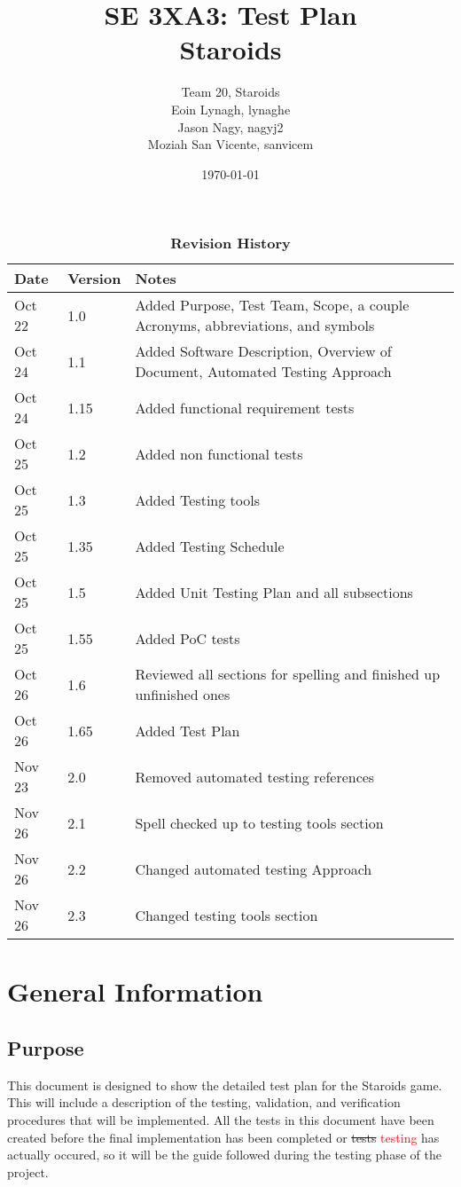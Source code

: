\documentclass[12pt, titlepage]{article}
\title{SE 3XA3: Test Plan\\Staroids}
\author{Team 20, Staroids
		\\ Eoin Lynagh, lynaghe
		\\ Jason Nagy, nagyj2
		\\ Moziah San Vicente, sanvicem
}
\date{\today}
\begin{document}
\maketitle

\tableofcontents
\listoftables
\listoffigures

\begin{table}[h]
\caption{\bf Revision History}
\begin{tabularx}{\textwidth}{p{3cm}p{2cm}X}
\toprule {\bf Date} & {\bf Version} & {\bf Notes}\\
\midrule
Oct 22 & 1.0 & Added Purpose, Test Team, Scope, a couple Acronyms, abbreviations, and symbols\\
Oct 24 & 1.1 & Added Software Description, Overview of Document, Automated Testing Approach\\
Oct 24 & 1.15 & Added functional requirement tests\\
Oct 25 & 1.2 & Added non functional tests\\
Oct 25 & 1.3 & Added Testing tools\\
Oct 25 & 1.35 & Added Testing Schedule\\
Oct 25 & 1.5 & Added Unit Testing Plan and all subsections\\
Oct 25 & 1.55 & Added PoC tests\\
Oct 26 & 1.6 & Reviewed all sections for spelling and finished up unfinished ones\\
Oct 26 & 1.65 & Added Test Plan\\
Nov 23 & 2.0 & Removed automated testing references\\
Nov 26 & 2.1 & Spell checked up to testing tools section\\
Nov 26 & 2.2 & Changed automated testing Approach\\
Nov 26 & 2.3 & Changed testing tools section\\
\bottomrule
\end{tabularx}
\end{table}

\newpage


\section{General Information}

\subsection{Purpose}
This document is designed to show the detailed test plan for the Staroids game. This will include a description of the testing, validation, and verification procedures that will be implemented. All the tests in this document have been created before the final implementation has been completed or \sout{tests} \textcolor{red}{testing} has actually occured, so it will be the guide followed during the testing phase of the project.
\end{document}

